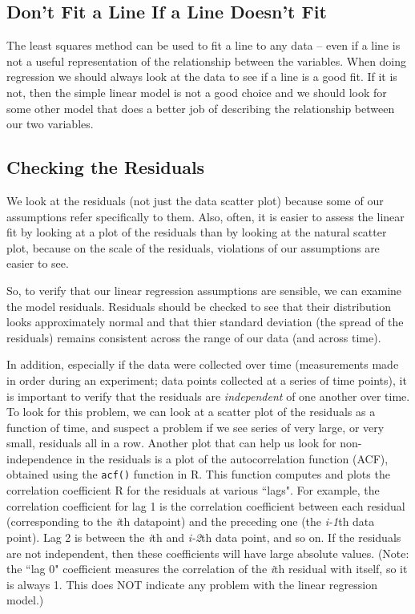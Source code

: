 \documentclass[twoside]{book}\usepackage[]{graphicx}\usepackage[]{xcolor}
\newcounter{example}[section]
\begin{document}
\subsection{Don't Fit a Line If a Line Doesn't Fit}

The least squares method can be used to fit a line to any data -- even if a line
is not a useful representation of the relationship between the variables.
When doing regression we should always look at the data to see if a line 
is a good fit.  If it is not, then the simple linear model is not a good choice and 
we should look for some other model that does a better job of describing the 
relationship between our two variables.  

\subsection{Checking the Residuals}
We look at the residuals (not just the data scatter plot) because some of our assumptions refer specifically to them.  Also, often, it is easier to assess the linear fit by looking at a plot of the 
residuals than by looking at the natural scatter plot, because on the scale 
of the residuals, violations of our assumptions are easier to see.

So, to verify that our linear regression assumptions are sensible, we can examine the model residuals. Residuals should be checked to see that their distribution looks approximately
normal and that thier standard deviation (the spread of the residuals) remains consistent across the range of our data (and across time).

In addition, especially if the data were collected over time (measurements made in order during an experiment; data points collected at a series of time points), it is important to verify that the residuals are \emph{independent} of one another over time.  To look for this problem, we can look at a scatter plot of the residuals as a function of time, and suspect a problem if we see series of very large, or very small, residuals all in a row.  Another plot that can help us look for non-independence in the residuals is a plot of the autocorrelation function (ACF), obtained using the \texttt{acf()} function in R.  This function computes and plots the correlation coefficient R for the residuals at various ``lags".  For example, the correlation coefficient for lag 1 is the correlation coefficient between each residual (corresponding to the \textit{i}th datapoint) and the preceding one (the \textit{i-1}th data point).  Lag 2 is between the \textit{i}th and \textit{i-2}th data point, and so on.  If the residuals are not independent, then these coefficients will have large absolute values.  (Note: the ``lag 0" coefficient measures the correlation of the \textit{i}th residual with itself, so it is always 1.  This does NOT indicate any problem with the linear regression model.)
\end{document}
